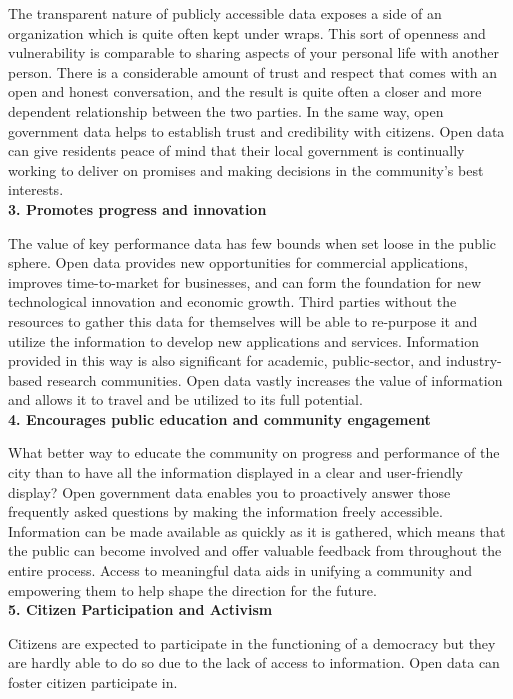 \documentclass[a4paper, 11pt,twoside=true]{scrartcl}
\begin{document}
\quad The transparent nature of publicly accessible data exposes a side of an organization which is quite often kept under wraps. This sort of openness and vulnerability is comparable to sharing aspects of your personal life with another person. There is a considerable amount of trust and respect that comes with an open and honest conversation, and the result is quite often a closer and more dependent relationship between the two parties. In the same way, open government data helps to establish trust and credibility with citizens. Open data can give residents peace of mind that their local government is continually working to deliver on promises and making decisions in the community’s best interests.\\
\textbf{3. Promotes progress and innovation}

\quad The value of key performance data has few bounds when set loose in the public sphere. Open data provides new opportunities for commercial applications, improves time-to-market for businesses, and can form the foundation for new technological innovation and economic growth. Third parties without the resources to gather this data for themselves will be able to re-purpose it and utilize the information to develop new applications and services. Information provided in this way is also significant for academic, public-sector, and industry-based research communities. Open data vastly increases the value of information and allows it to travel and be utilized to its full potential.\\
\textbf{4.  Encourages public education and community engagement}

\quad What better way to educate the community on progress and performance of the city than to have all the information displayed in a clear and user-friendly display? Open government data enables you to proactively answer those frequently asked questions by making the information freely accessible. Information can be made available as quickly as it is gathered, which means that the public can become involved and offer valuable feedback from throughout the entire process. Access to meaningful data aids in unifying a community and empowering them to help shape the direction for the future.\\
\textbf{5. Citizen Participation and Activism}

\quad Citizens are expected to participate in the functioning of a democracy but they are hardly able to do so due to the lack of access to information. Open data can foster citizen participate in.
\end{document}
